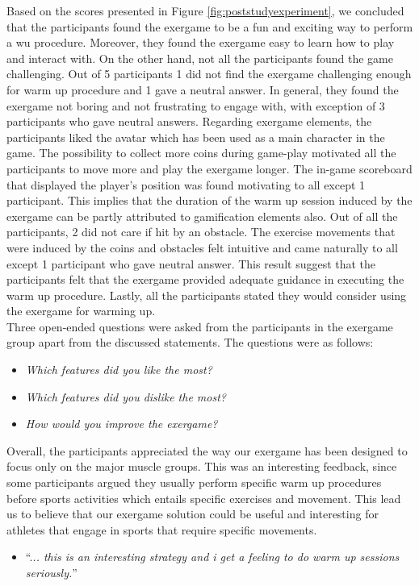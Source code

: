 Based on the scores presented in Figure \ref{fig:poststudyexperiment}, we concluded that the participants found the exergame to be a fun and exciting way to perform a \acrshort{wu} procedure. Moreover, they found the exergame easy to learn how to play and interact with. On the other hand, not all the participants found the game challenging. Out of 5 participants 1 did not find the exergame challenging enough for warm up procedure and 1 gave a neutral answer. In general, they found the exergame not boring and not frustrating to engage with, with exception of 3 participants who gave neutral answers.  Regarding exergame elements, the participants liked the avatar which has been used as a main character in the game. The possibility to collect more coins during game-play motivated all the participants to move more and play the exergame longer. The in-game scoreboard that displayed the player's position was found motivating to all except 1 participant. This implies that the duration of the warm up session induced by the exergame can be partly attributed to gamification elements also. Out of all the participants, 2 did not care if hit by an obstacle. The exercise movements that were induced by the coins and obstacles felt intuitive and came naturally to all except 1 participant who gave neutral answer. This result suggest that the participants felt that the exergame provided adequate guidance in executing the warm up procedure. Lastly, all the participants stated they would consider using the exergame for warming up. \\Three open-ended questions were asked from the participants in the exergame group apart from the discussed statements. The questions were as follows:
\begin{itemize}
\item \textit{Which features did you like the most?}
\item \textit{Which features did you dislike the most?}
\item \textit{How would you improve the exergame?}
\end{itemize}
Overall, the participants appreciated the way our exergame has been designed to focus only on the major muscle groups. This was an interesting feedback, since some participants argued they usually perform specific warm up procedures before sports activities which entails specific exercises and movement. This lead us to believe that our exergame solution could be useful and interesting for athletes that engage in sports that require specific movements.
\begin{itemize}
\item ``.\textit{.. this is an interesting strategy and i get a feeling to do warm up sessions seriously.}''
\end{itemize}
